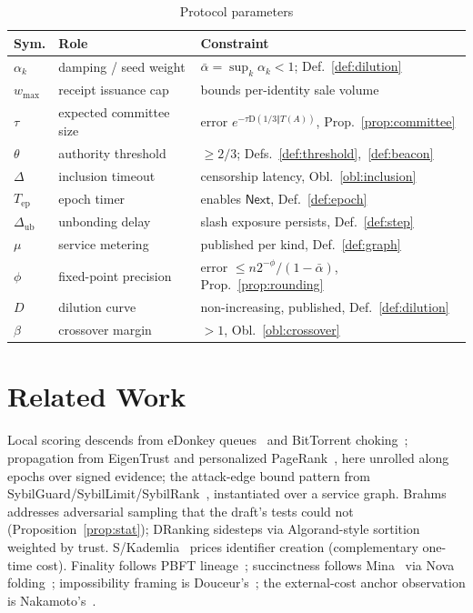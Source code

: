 \documentclass[11pt,letterpaper]{article}
\begin{document}
\begin{table}[H]
\centering
\caption{Protocol parameters}\label{tab:params}
\renewcommand{\arraystretch}{1.2}
\begin{tabularx}{\linewidth}{@{}lYY@{}}
\toprule
\textbf{Sym.} & \textbf{Role} & \textbf{Constraint} \\
\midrule
$\alpha_k$ & damping / seed weight &
  $\bar\alpha=\sup_k\alpha_k<1$; Def.~\ref{def:dilution} \\
$w_{\max}$ & receipt issuance cap &
  bounds per-identity sale volume \\
$\tau$ & expected committee size &
  error $e^{-\tau\mathrm{D}(1/3\Vert T(A))}$,
  Prop.~\ref{prop:committee} \\
$\theta$ & authority threshold &
  $\geq2/3$; Defs.~\ref{def:threshold},~\ref{def:beacon} \\
$\Delta$ & inclusion timeout &
  censorship latency, Obl.~\ref{obl:inclusion} \\
$T_{\mathrm{ep}}$ & epoch timer &
  enables $\mathsf{Next}$, Def.~\ref{def:epoch} \\
$\Delta_{\mathrm{ub}}$ & unbonding delay &
  slash exposure persists, Def.~\ref{def:step} \\
$\mu$ & service metering &
  published per kind, Def.~\ref{def:graph} \\
$\phi$ & fixed-point precision &
  error $\leq n2^{-\phi}/(1-\bar\alpha)$,
  Prop.~\ref{prop:rounding} \\
$D$ & dilution curve &
  non-increasing, published, Def.~\ref{def:dilution} \\
$\beta$ & crossover margin &
  $>1$, Obl.~\ref{obl:crossover} \\
\bottomrule
\end{tabularx}
\end{table}

\section{Related Work}\label{sec:related}

Local scoring descends from eDonkey queues~\cite{eMule} and BitTorrent
choking~\cite{Cohen03}; propagation from EigenTrust and personalized
PageRank~\cite{EigenTrust,PageRank}, here unrolled along epochs over signed
evidence; the attack-edge bound pattern from
SybilGuard/SybilLimit/SybilRank~\cite{SybilGuard,SybilLimit,SybilRank},
instantiated over a service graph.  Brahms~\cite{Brahms} addresses
adversarial sampling that the draft's tests could not
(Proposition~\ref{prop:stat}); DRanking sidesteps via Algorand-style
sortition~\cite{Algorand,VRF} weighted by trust.
S/Kademlia~\cite{SKademlia} prices identifier creation (complementary
one-time cost).  Finality follows PBFT lineage~\cite{PBFT,LSP82};
succinctness follows Mina~\cite{Mina} via Nova folding~\cite{Nova};
impossibility framing is Douceur's~\cite{Douceur2002}; the external-cost
anchor observation is Nakamoto's~\cite{Nakamoto}.
\end{document}
